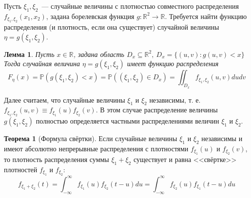 \documentclass[oneside,final,14pt]{extreport}
\theoremstyle{plain}
\newtheorem*{lem}{Лемма}
\theoremstyle{definition}
\theoremstyle{named}
\newtheorem*{namedthm}{Теорема}
\begin{document}
Пусть $\xi_1, \xi_2$~--- случайные величины с плотностью совместного распределения $f_{\xi_{1}, \xi_{2}}\left(x_{1}, x_{2}\right)$, задана борелевская функция $g: \mathbb{R}^{2} \rightarrow \mathbb{R}$. Требуется найти функцию распределения (и плотность, если она существует) случайной величины $\eta=g\left(\xi_{1}, \xi_{2}\right)$.
\begin{lem}
    Пусть $x \in \mathbb{R}$, задана область $D_{x} \subseteq \mathbb{R}^{2},~ D_x = \{ (u,v): g(u,v) < x\}$ Тогда случайная величина $\eta=g\left(\xi_{1}, \xi_{2}\right)$ имеет функцию распределения
    \begin{equation*}
        F_{\eta}(x)=\mathbb{P}\left(g\left(\xi_{1}, \xi_{2}\right)<x\right)=\mathbb{P}\left(\left(\xi_{1}, \xi_{2}\right) \in D_{x}\right)=\iint_{D_{x}} f_{\xi_{1}, \xi_{2}}(u, v) d u d v
    \end{equation*}
\end{lem}
Далее считаем, что случайные величины $\xi_1$ и $\xi_2$ независимы, т. е. $f_{\xi_{1}, \xi_{2}}(u, v) \equiv f_{\xi_{1}}(u) f_{\xi_{2}}(v)$. В этом случае распределение величины $g\left(\xi_{1}, \xi_{2}\right)$ полностью определяется частными распределениями величин $\xi_1$ и $\xi_2$.
\begin{namedthm}[Формула свёртки]
    Если случайные величины $\xi_1$ и $\xi_2$ независимы и имеют абсолютно непрерывные распределения с плотностями $f_{\xi_{1}}(u)$ и $f_{\xi_{2}}(v)$, то плотность распределения суммы $\xi_{1}+\xi_{2}$ существует и равна <<свёртке>> плотностей $f_{\xi_{1}}$ и $f_{\xi_{2}}$:
    \begin{equation*}
        f_{\xi_{1}+\xi_{2}}(t)=\int_{-\infty}^{\infty} f_{\xi_{1}}(u) f_{\xi_{2}}(t-u) d u=\int_{-\infty}^{\infty} f_{\xi_{2}}(u) f_{\xi_{1}}(t-u) d u
    \end{equation*}
\end{namedthm}
\end{document}
